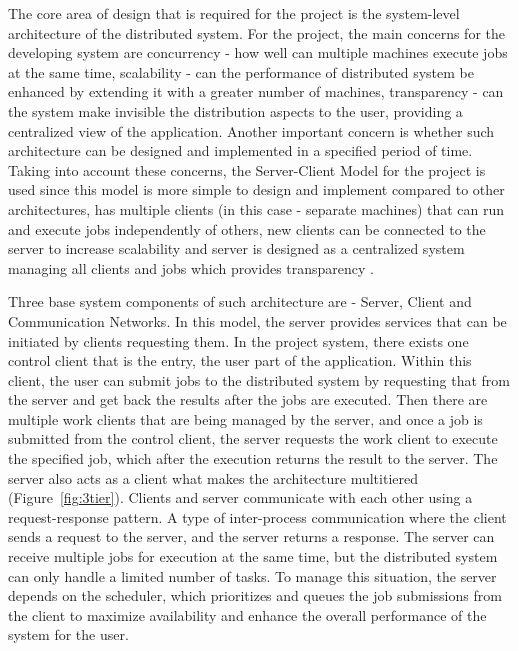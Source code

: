 \documentclass[10pt]{report}
\begin{document}
The core area of design that is required for the project is the system-level architecture of the distributed system. For the project, the main concerns for the developing system are concurrency - how well can multiple machines execute jobs at the same time, scalability - can the performance of distributed system be enhanced by extending it with a greater number of machines, transparency - can the system make invisible the distribution aspects to the user, providing a centralized view of the application. Another important concern is whether such architecture can be designed and implemented in a specified period of time. Taking into account these concerns, the Server-Client Model for the project is used since this model is more simple to design and implement compared to other architectures, has multiple clients (in this case - separate machines) that can run and execute jobs independently of others, new clients can be connected to the server to increase scalability and server is designed as a centralized system managing all clients and jobs which provides transparency \cite{clientserver}.
\newline

Three base system components of such architecture are - Server, Client and Communication Networks. In this model, the server provides services that can be initiated by clients requesting them. In the project system, there exists one control client that is the entry, the user part of the application. Within this client, the user can submit jobs to the distributed system by requesting that from the server and get back the results after the jobs are executed. Then there are multiple work clients that are being managed by the server, and once a job is submitted from the control client, the server requests the work client to execute the specified job, which after the execution returns the result to the server. The server also acts as a client what makes the architecture multitiered (Figure~\ref{fig:3tier}). Clients and server communicate with each other using a request-response pattern. A type of inter-process communication where the client sends a request to the server, and the server returns a response. The server can receive multiple jobs for execution at the same time, but the distributed system can only handle a limited number of tasks. To manage this situation, the server depends on the scheduler, which prioritizes and queues the job submissions from the client to maximize availability and enhance the overall performance of the system for the user.
\end{document}
